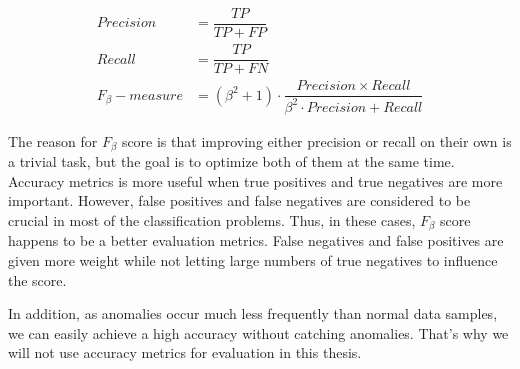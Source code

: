 \begin{align}
    Precision &= \dfrac{TP}{TP + FP} \\
    Recall &= \dfrac{TP}{TP + FN} \\
    F_{\beta}-measure &= (\beta^2 + 1) \cdot \dfrac{Precision \times Recall }{\beta^2 \cdot Precision + Recall} 
\end{align}

The reason for $F_{\beta}$ score is that improving either precision or recall on their own is a trivial task, but the goal is to optimize both of them at the same time. Accuracy metrics is more useful when true positives and true negatives are more important. However, false positives and false negatives are considered to be crucial in most of the classification problems. Thus, in these cases, $F_{\beta}$ score happens to be a better evaluation metrics. False negatives and false positives are given more weight while not letting large numbers of true negatives to influence the score.

In addition, as anomalies occur much less frequently than normal data samples, we can easily achieve a high accuracy without catching anomalies. That's why we will not use accuracy metrics for evaluation in this thesis.

